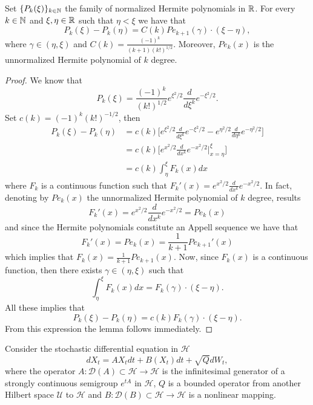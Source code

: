 \documentclass[review, onefignum, onetabnum]{siamart171218}
\begin{document}
\begin{lemma}\label{le-s3-1}
 Set $\{P_k(\xi)\}_{k\in {\mathbb N}}$ the family of normalized Hermite polynomials in 
${\mathbb R}$. For every $k\in{\mathbb N}$ and $\xi, 
 \eta\in{\mathbb R}$ such that
 $\eta<\xi$ we have that
 \begin{equation}
  P_k(\xi)-P_k(\eta)= C(k)  Pe_{k+1}(\gamma) \cdot (\xi-\eta), \label{Pk-dif}
 \end{equation}
where $\gamma\in (\eta,\xi)$ and $C(k)=\frac{(-1)^k}{(k+1)(k!)^{1/2}} $. 
Moreover, $Pe_k(x)$ is the 
unnormalized Hermite polynomial of $k$ degree.
\end{lemma}
\begin{proof}
 We know that 
 $$
 P_k(\xi)=\frac{(-1)^k}{(k!)^{1/2}} e^{\xi^2/2}\frac{d}{d\xi^k}e^{-\xi^2/2}.
 $$
 Set $c(k)=(-1)^k (k!)^{-1/2}$, then
 \begin{align}
 P_k(\xi)-P_k(\eta)&=c(k)\Big[ 
e^{\xi^2/2}\frac{d}{d\xi^k}e^{-\xi^2/2}-e^{\eta^2/2}\frac{d}{d\eta^k}e^{-\eta^2/2}\Big]\nonumber\\
  & =c(k) 
\Bigg[e^{x^2/2}\frac{d}{dx^k}e^{-x^2/2}\Big|_{x=\eta}^\xi\Bigg]\nonumber\\
  & = c(k) \int_{\eta}^\xi F_k(x) dx \nonumber
 \end{align}
where $F_k$ is a continuous function such that 
$F_k'(x)=e^{x^2/2}\frac{d}{dx^k}e^{-x^2/2}$. In fact, denoting by $Pe_k(x)$ 
the 
unnormalized Hermite polynomial of $k$ degree, results 
$$
F_k'(x)=e^{x^2/2}\frac{d}{dx^k}e^{-x^2/2}= Pe_k(x)
$$
 and since the Hermite polynomials constitute an Appell sequence we have that
$$
F_k'(x)=Pe_k(x)=\frac{1}{k+1} Pe_{k+1}'(x)
$$ 
 which implies that $F_k(x)=\frac{1}{k+1} Pe_{k+1}(x)$. Now, since $F_k(x)$ is 
a continuous function, then there exists 
 $\gamma\in (\eta,\xi)$ such that 
 $$
 \int_{\eta}^\xi F_k(x) dx = F_k(\gamma)\cdot (\xi-\eta).
 $$
 All these implies that 
 \begin{equation*}
  P_k(\xi)-P_k(\eta)= c(k) F_k(\gamma) \cdot (\xi-\eta).
 \end{equation*}
 From this expression the lemma follows immediately.
\end{proof}

Consider the stochastic differential equation in $\mathcal{H}$ 
\begin{equation}
\label{P1s2.1}
 dX_t=AX_tdt+B(X_t)dt+\sqrt{Q}dW_t,
\end{equation}
where the operator $A:\mathcal{D}(A)\subset \mathcal{H}\rightarrow 
\mathcal{H}$ is the infinitesimal generator of a strongly 
continuous semigroup $e^{tA}$ in $\mathcal{H}$, $Q$ is a bounded operator from 
another Hilbert space $\mathcal{U}$ to $\mathcal{H}$ 
and $B:\mathcal{D}(B)\subset \mathcal{H}\rightarrow \mathcal{H}$ is a 
nonlinear mapping. 
\end{document}
